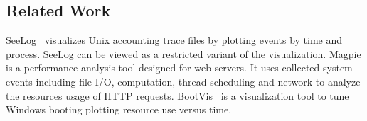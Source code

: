 \subsection{Related Work}
\label{sec:related}




SeeLog~\cite{eick1995dtf} visualizes Unix accounting trace files by
plotting events by time and process.
SeeLog can be viewed as a restricted variant of the
\VDP{} visualization.
Magpie \cite{magpie} is a performance analysis tool designed for web servers.
It uses collected system events including file I/O, computation,
thread scheduling and network to analyze the resources usage of
HTTP requests.
BootVis~\cite{bootvis} 
is a visualization tool to tune
Windows booting plotting resource use versus time.

